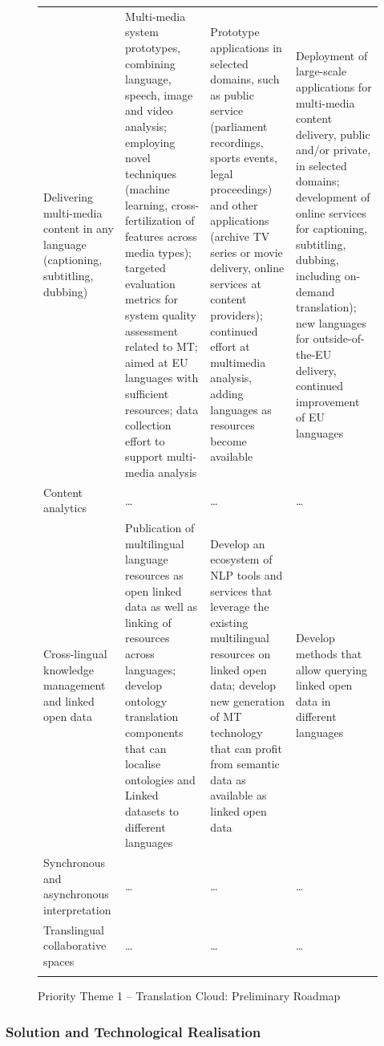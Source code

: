 \documentclass[10pt, plain]{../../metanetpaper}
\begin{document}
\begin{multicols}{2}
\begin{figure}[htbp]
\begin{tabular}{@{}p{2.5cm}p{4cm}p{4cm}p{4cm}@{}}
    Delivering multi-media content in any language (captioning, subtitling, dubbing) & Multi-media system prototypes, combining language, speech, image and video analysis; employing novel techniques (machine learning, cross-fertilization of features across media types); targeted evaluation metrics for system quality assessment related to MT; aimed at EU languages with sufficient resources; data collection effort to support multi-media analysis & Prototype applications in selected domains, such as public service (parliament recordings, sports events, legal proceedings) and other applications (archive TV series or movie delivery, online services at content providers); continued effort at multimedia analysis, adding languages as resources become available & Deployment of large-scale applications for multi-media content delivery, public and/or private, in selected domains; development of online services for captioning, subtitling, dubbing, including on-demand translation); new languages for outside-of-the-EU delivery, continued improvement of EU languages \\ \addlinespace
Content analytics & \dots & \dots & \dots \\ \addlinespace
Cross-lingual knowledge management and linked open data & Publication of multilingual language resources as open linked data as well as linking of resources across languages; develop ontology translation components that can localise ontologies and Linked datasets to different languages & Develop an ecosystem of NLP tools and services that leverage the existing multilingual resources on linked open data; develop new generation of MT technology that can profit from semantic data as available as linked open data & Develop methods that allow querying linked open data in different languages \\ \addlinespace
Synchronous and asynchronous interpretation & \dots & \dots & \dots \\ \addlinespace
Translingual collaborative spaces & \dots & \dots & \dots \\ \addlinespace\bottomrule
  \end{tabular}
  \caption{Priority Theme 1 -- Translation Cloud: Preliminary Roadmap}
  \label{fig:pt1-roadmap}
\end{figure}

\subsubsection{Solution and Technological Realisation}
\label{sec:solut-techn-real-pt1}


\end{multicols}
\end{document}
